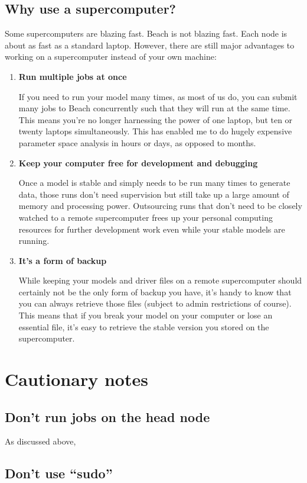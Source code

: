 \documentclass[12pt, oneside]{article}   	%
\begin{document}
\subsection{Why use a supercomputer?}
Some supercomputers are blazing fast. Beach is not blazing fast. Each node is about as fast as a standard laptop. However, there are still major advantages to working on a supercomputer instead of your own machine:
\begin{enumerate}
\item \textbf{Run multiple jobs at once}\par
If you need to run your model many times, as most of us do, you can submit many jobs to Beach concurrently such that they will run at the same time. This means you're no longer harnessing the power of one laptop, but ten or twenty laptops simultaneously. This has enabled me to do hugely expensive parameter space analysis in hours or days, as opposed to months.
\item \textbf{Keep your computer free for development and debugging}\par
Once a model is stable and simply needs to be run many times to generate data, those runs don't need supervision but still take up a large amount of memory and processing power. Outsourcing runs that don't need to be closely watched to a remote supercomputer frees up your personal computing resources for further development work even while your stable models are running.
\item \textbf{It's a form of backup}\par
While keeping your models and driver files on a remote supercomputer should certainly not be the only form of backup you have, it's handy to know that you can always retrieve those files (subject to admin restrictions of course). This means that if you break your model on your computer or lose an essential file, it's easy to retrieve the stable version you stored on the supercomputer.
\end{enumerate}

\section{Cautionary notes}
\subsection{Don't run jobs on the head node}
As discussed above, 
\subsection{Don't use ``sudo''}
\end{document}
